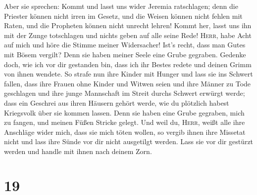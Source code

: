  Aber sie sprechen: Kommt und lasst uns wider Jeremia
ratschlagen; denn die Priester können nicht irren im Gesetz, und die
Weisen können nicht fehlen mit Raten, und die Propheten können nicht
unrecht lehren! Kommt her, lasst uns ihn mit der Zunge totschlagen und
nichts geben auf alle seine Rede!  \textsc{Herr}, habe
Acht auf mich und höre die Stimme meiner Widersacher! 
Ist's recht, dass man Gutes mit Bösem vergilt? Denn sie haben meiner
Seele eine Grube gegraben. Gedenke doch, wie ich vor dir gestanden bin,
dass ich ihr Bestes redete und deinen Grimm von ihnen wendete.
 So strafe nun ihre Kinder mit Hunger und lass sie ins
Schwert fallen, dass ihre Frauen ohne Kinder und Witwen seien und ihre
Männer zu Tode geschlagen und ihre junge Mannschaft im Streit durchs
Schwert erwürgt werde;  dass ein Geschrei aus ihren
Häusern gehört werde, wie du plötzlich habest Kriegsvolk über sie kommen
lassen. Denn sie haben eine Grube gegraben, mich zu fangen, und meinen
Füßen Stricke gelegt.  Und weil du, \textsc{Herr}, weißt
alle ihre Anschläge wider mich, dass sie mich töten wollen, so vergib
ihnen ihre Missetat nicht und lass ihre Sünde vor dir nicht ausgetilgt
werden. Lass sie vor dir gestürzt werden und handle mit ihnen nach
deinem Zorn.

\hypertarget{section-18}{%
\section{19}\label{section-18}}

